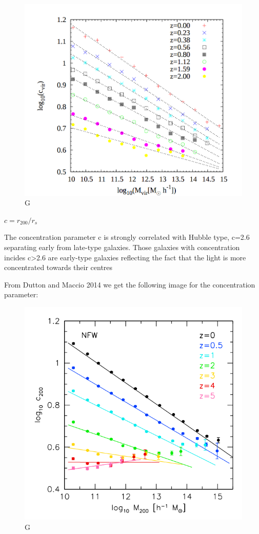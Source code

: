 \begin{figure}[H]
\centering
\includegraphics[width=12cm]{images/juank.png}
\caption[M]{G}
\end{figure}


$c=r_{200}/r_{s}$

The concentration parameter c is strongly correlated with Hubble type, c=2.6 separating early from late-type galaxies. Those galaxies with concentration incides c>2.6 are early-type galaxies reflecting the fact that the light is more concentrated towards their centres

From Dutton and Maccio 2014 we get the following image for the concentration parameter:

\begin{figure}[H]
\centering
\includegraphics[width=12cm]{images/dutton.png}
\caption[M]{G}
\end{figure}



